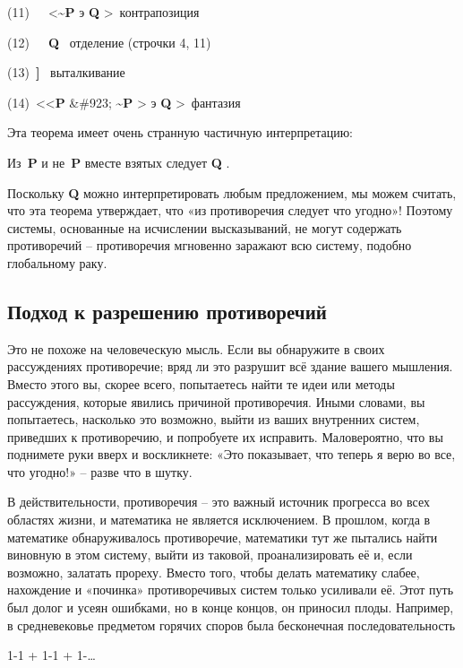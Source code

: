\documentclass[../main.tex]{subfiles}
\begin{document}
(11)~~~\textless{}\textbf{\textasciitilde P} э \textbf{Q} \textgreater~контрапозиция

(12)~~~\textbf{Q} ~отделение (строчки 4, 11)

(13)~\textbf{{]}} ~выталкивание

(14)~\textless\textless{}\textbf{P} \&\#923; \textbf{\textasciitilde P} \textgreater{} э \textbf{Q} \textgreater~фантазия

Эта теорема имеет очень странную частичную интерпретацию:

Из~\textbf{P} и не~\textbf{P} вместе взятых следует \textbf{Q} .

Поскольку \textbf{Q} можно интерпретировать любым предложением, мы можем считать, что эта теорема утверждает, что «из противоречия следует что угодно»! Поэтому системы, основанные на исчислении высказываний, не могут содержать противоречий \--- противоречия мгновенно заражают всю систему, подобно глобальному раку.


\subsection{Подход к разрешению противоречий}

Это не похоже на человеческую мысль. Если вы обнаружите в своих рассуждениях противоречие; вряд ли это разрушит всё здание вашего мышления. Вместо этого вы, скорее всего, попытаетесь найти те идеи или методы рассуждения, которые явились причиной противоречия. Иными словами, вы попытаетесь, насколько это возможно, выйти из ваших внутренних систем, приведших к противоречию, и попробуете их исправить. Маловероятно, что вы поднимете руки вверх и воскликнете: «Это показывает, что теперь я верю во все, что угодно!» \--- разве что в шутку.

В действительности, противоречия \--- это важный источник прогресса во всех областях жизни, и математика не является исключением. В прошлом, когда в математике обнаруживалось противоречие, математики тут же пытались найти виновную в этом систему, выйти из таковой, проанализировать её и, если возможно, залатать прореху. Вместо того, чтобы делать математику слабее, нахождение и «починка» противоречивых систем только усиливали её. Этот путь был долог и усеян ошибками, но в конце концов, он приносил плоды. Например, в средневековье предметом горячих споров была бесконечная последовательность

1-1 + 1-1 + 1-\ldots{}
\end{document}
